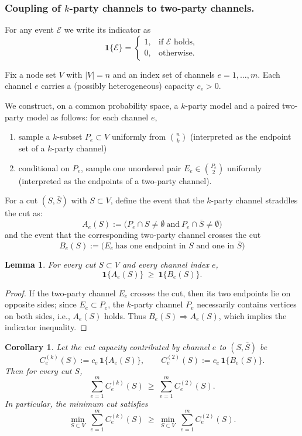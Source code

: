 \documentclass[10pt,twocolumn]{article}
\newtheorem{corollary}{Corollary}[theorem]
\newtheorem{lemma}[theorem]{Lemma}
\begin{document}
\subsubsection{Coupling of $k$-party channels to two-party channels.}
For any event $\mathcal{E}$ we write its indicator as
\[
\mathbf{1}\{\mathcal{E}\}
=\begin{cases}
1,&\text{if $\mathcal{E}$ holds},\\
0,&\text{otherwise}.
\end{cases}
\]

Fix a node set $V$ with $|V|=n$ and an index set of channels $e=1,\dots,m$.
Each channel $e$ carries a (possibly heterogeneous) capacity $c_e>0$.

We construct, on a common probability space, a $k$-party model and a paired two-party model as follows:
for each channel $e$,
\begin{enumerate}
\item sample a $k$-subset $P_e\subset V$ uniformly from $\binom{n}{k}$ (interpreted as the endpoint set of a $k$-party channel)
\item conditional on $P_e$, sample one unordered pair $E_e\in\binom{P_e}{2}$ uniformly (interpreted as the endpoints of a two-party channel).
\end{enumerate}
For a cut $(S,\bar S)$ with $S\subset V$, define the event that the $k$-party channel straddles the cut as:
\[
A_e(S):=\big(P_e\cap S\neq\emptyset\ \text{and}\ P_e\cap\bar S\neq\emptyset\big)
\]
and the event that the corresponding two-party channel crosses the cut
\[
B_e(S):=\big(E_e\ \text{has one endpoint in $S$ and one in $\bar S$}\big)
\]

\begin{lemma}\label{lem:indicator-dominance}
For every cut $S\subset V$ and every channel index $e$,
\[
\mathbf{1}\{A_e(S)\}\ \ge\ \mathbf{1}\{B_e(S)\}.
\]
\end{lemma}

\begin{proof}
If the two-party channel $E_e$ crosses the cut, then its two endpoints lie on opposite sides; since $E_e\subset P_e$, the $k$-party channel $P_e$ necessarily contains vertices on both sides, i.e., $A_e(S)$ holds. Thus $B_e(S)\Rightarrow A_e(S)$, which implies the indicator inequality.
\end{proof}

\begin{corollary}\label{cor:cut-capacity-dominance}
Let the cut capacity contributed by channel $e$ to $(S,\bar S)$ be
\[
C^{(k)}_e(S):=c_e\,\mathbf{1}\{A_e(S)\},\qquad
C^{(2)}_e(S):=c_e\,\mathbf{1}\{B_e(S)\}.
\]
Then for every cut $S$,
\[
\sum_{e=1}^m C^{(k)}_e(S)\ \ge\ \sum_{e=1}^m C^{(2)}_e(S).
\]
In particular, the minimum cut satisfies
\[
\min_{S\subset V}\ \sum_{e=1}^m C^{(k)}_e(S)\ \ge\ \min_{S\subset V}\ \sum_{e=1}^m C^{(2)}_e(S).
\]
\end{corollary}
\end{document}

